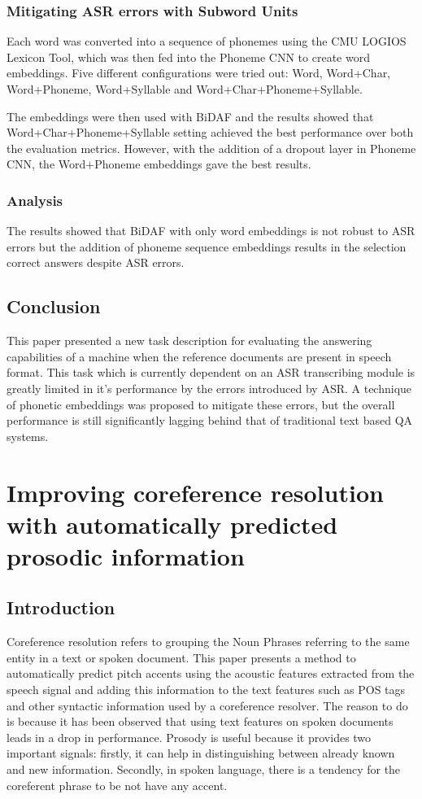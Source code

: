 \documentclass[a4paper]{article}
\begin{document}
\subsubsection{Mitigating ASR errors with Subword Units}
Each word was converted into a sequence of phonemes using the CMU LOGIOS Lexicon Tool, which was then fed into the Phoneme CNN to create word embeddings. Five different configurations were tried out: Word, Word+Char, Word+Phoneme, Word+Syllable and Word+Char+Phoneme+Syllable.

The embeddings were then used with BiDAF and the results showed that Word+Char+Phoneme+Syllable setting achieved the best performance over both the evaluation metrics. However, with the addition of a dropout layer in Phoneme CNN, the Word+Phoneme embeddings gave the best results.

\subsubsection{Analysis}
The results showed that BiDAF with only word embeddings is not robust to ASR errors but the addition of phoneme sequence embeddings results in the selection correct answers despite ASR errors.

\subsection{Conclusion}
This paper presented a new task description for evaluating the answering capabilities of a machine when the reference documents are present in speech format. This task which is currently dependent on an ASR transcribing module is greatly limited in it's performance by the errors introduced by ASR. A technique of phonetic embeddings was proposed to mitigate these errors, but the overall performance is still significantly lagging behind that of traditional text based QA systems.

\section{Improving coreference resolution with automatically predicted prosodic information}
\subsection{Introduction}
Coreference resolution refers to grouping the Noun Phrases referring to the same entity in a text or spoken document. This paper presents a method to automatically predict pitch accents using the acoustic features extracted from the speech signal and adding this information to the text features such as POS tags and other syntactic information used by a coreference resolver. The reason to do is because it has been observed that using text features on spoken documents leads in a drop in performance. Prosody is useful because it provides two important signals: firstly, it can help in distinguishing between already known and new information. Secondly, in spoken language, there is a tendency for the coreferent phrase to be not have any accent.
\end{document}
